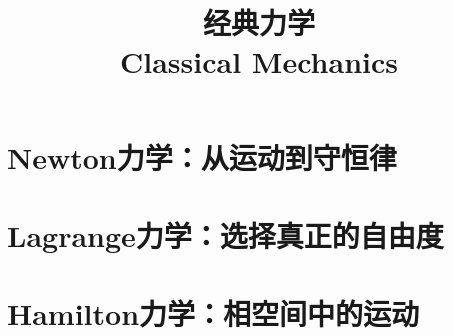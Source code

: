 \documentclass{../thunote}
\title{经典力学\\Classical Mechanics}
\begin{document}
\maketitle

\frontmatter

\tableofcontents

\mainmatter

\part{Newton力学：从运动到守恒律}





\part{Lagrange力学：选择真正的自由度}




\part{Hamilton力学：相空间中的运动}



\appendix

\end{document}
